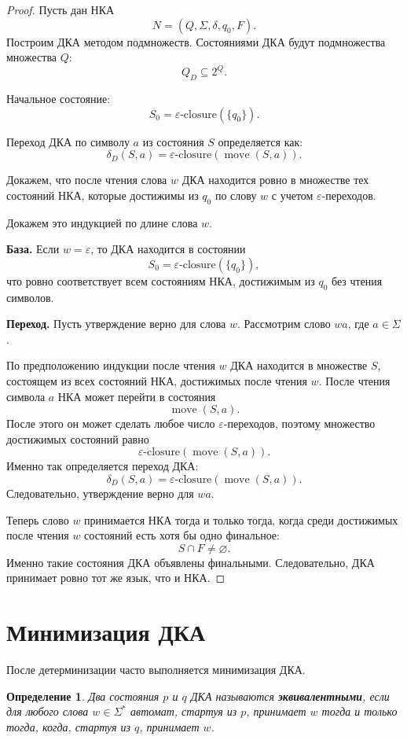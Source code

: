 \documentclass[12pt,a4paper]{article}
\newtheorem{definition}{Определение}
\begin{document}
\begin{proof}
Пусть дан НКА
\[
N=(Q,\Sigma,\delta,q_0,F).
\]
Построим ДКА методом подмножеств. Состояниями ДКА будут подмножества множества $Q$:
\[
Q_D \subseteq 2^Q.
\]

Начальное состояние:
\[
S_0 = \varepsilon\text{-closure}(\{q_0\}).
\]

Переход ДКА по символу $a$ из состояния $S$ определяется как:
\[
\delta_D(S,a)=\varepsilon\text{-closure}(\operatorname{move}(S,a)).
\]

Докажем, что после чтения слова $w$ ДКА находится ровно в множестве тех состояний НКА, которые достижимы из $q_0$ по слову $w$ с учетом $\varepsilon$-переходов.

Докажем это индукцией по длине слова $w$.

\textbf{База.} Если $w=\varepsilon$, то ДКА находится в состоянии
\[
S_0=\varepsilon\text{-closure}(\{q_0\}),
\]
что ровно соответствует всем состояниям НКА, достижимым из $q_0$ без чтения символов.

\textbf{Переход.} Пусть утверждение верно для слова $w$. Рассмотрим слово $wa$, где $a\in\Sigma$.

По предположению индукции после чтения $w$ ДКА находится в множестве $S$, состоящем из всех состояний НКА, достижимых после чтения $w$. После чтения символа $a$ НКА может перейти в состояния
\[
\operatorname{move}(S,a).
\]
После этого он может сделать любое число $\varepsilon$-переходов, поэтому множество достижимых состояний равно
\[
\varepsilon\text{-closure}(\operatorname{move}(S,a)).
\]
Именно так определяется переход ДКА:
\[
\delta_D(S,a)=\varepsilon\text{-closure}(\operatorname{move}(S,a)).
\]
Следовательно, утверждение верно для $wa$.

Теперь слово $w$ принимается НКА тогда и только тогда, когда среди достижимых после чтения $w$ состояний есть хотя бы одно финальное:
\[
S \cap F \ne \varnothing.
\]
Именно такие состояния ДКА объявлены финальными. Следовательно, ДКА принимает ровно тот же язык, что и НКА.
\end{proof}

\section{Минимизация ДКА}

После детерминизации часто выполняется минимизация ДКА.

\begin{definition}
Два состояния $p$ и $q$ ДКА называются \textbf{эквивалентными}, если для любого слова $w \in \Sigma^*$ автомат, стартуя из $p$, принимает $w$ тогда и только тогда, когда, стартуя из $q$, принимает $w$.
\end{definition}
\end{document}
